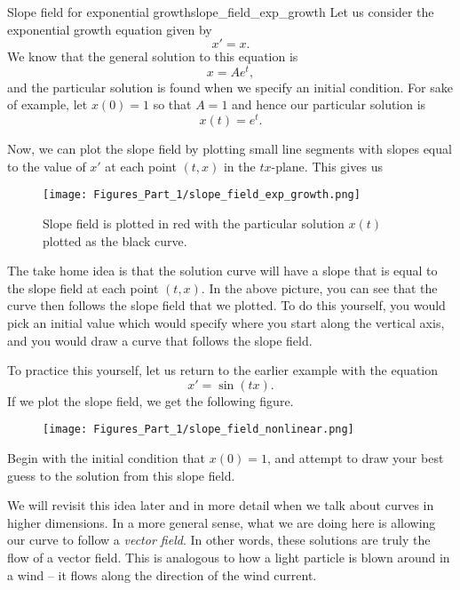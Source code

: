             \begin{ex}{Slope field for exponential growth}{slope_field_exp_growth}
                Let us consider the exponential growth equation given by
                \[
                x'=x.
                \]
                We know that the general solution to this equation is
                \[
                x=Ae^t,
                \]
                and the particular solution is found when we specify an initial condition. For sake of example, let $x(0)=1$ so that $A=1$ and hence our particular solution is
                \[
                x(t)=e^t.
                \]

                Now, we can plot the slope field by plotting small line segments with slopes equal to the value of $x'$ at each point $(t,x)$ in the $tx$-plane. This gives us
                \begin{figure}[H]
                    \centering
                    \texttt{[image: Figures\_Part\_1/slope\_field\_exp\_growth.png]}
                    \caption{Slope field is plotted in red with the particular solution $x(t)$ plotted as the black curve.}
                \end{figure}

                The take home idea is that the solution curve will have a slope that is equal to the slope field at each point $(t,x)$. In the above picture, you can see that the curve then follows the slope field that we plotted. To do this yourself, you would pick an initial value which would specify where you start along the vertical axis, and you would draw a curve that follows the slope field.
            \end{ex}

            To practice this yourself, let us return to the earlier example with the equation
            \[
            x'=\sin(tx).
            \]
            If we plot the slope field, we get the following figure.
            \begin{figure}[H]
                \centering
                \texttt{[image: Figures\_Part\_1/slope\_field\_nonlinear.png]}
            \end{figure}
            Begin with the initial condition that $x(0)=1$, and attempt to draw your best guess to the solution from this slope field.

            We will revisit this idea later and in more detail when we talk about curves in higher dimensions.  In a more general sense, what we are doing here is allowing our curve to follow a \emph{vector field}.  In other words, these solutions are truly the flow of a vector field.  This is analogous to how a light particle is blown around in a wind -- it flows along the direction of the wind current.



